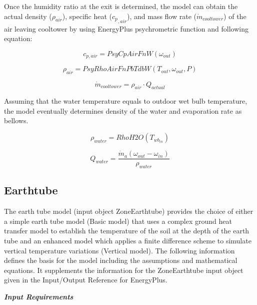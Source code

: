 Once the humidity ratio at the exit is determined, the model can obtain the actual density (\({\rho_{air}}\)), specific heat (\({c_p}_{,air}\)), and mass flow rate (\({\dot m_{cooltower}}\)) of the air leaving cooltower by using EnergyPlus psychrometric function and following equation:

\begin{equation}
{c_{p,air}} = PsyCpAirFnW({\omega_{out}})
\end{equation}

\begin{equation}
{\rho_{air}} = PsyRhoAirFnPbTdbW({T_{out}},{\omega_{out}},P)
\end{equation}

\begin{equation}
{\dot m_{cooltower}} = {\rho_{air}} \cdot {Q_{actual}}
\end{equation}

Assuming that the water temperature equals to outdoor wet bulb temperature, the model eventually determines density of the water and evaporation rate as bellows.

\begin{equation}
{\rho_{water}} = RhoH2O({T_{w{b_{in}}}})
\end{equation}

\begin{equation}
{Q_{water}} = \frac{{{{\dot m}_a}({\omega_{out}} - {\omega_{in}})}}{{{\rho_{water}}}}
\end{equation}

\subsection{Earthtube}\label{earthtube}

The earth tube model (input object ZoneEarthtube) provides the choice of either a simple earth tube model (Basic model) that uses a complex ground heat transfer model to establish the temperature of the soil at the depth of the earth tube and an enhanced model which applies a finite difference scheme to simulate vertical temperature variations (Vertical model). The following information defines the basis for the model including the assumptions and mathematical equations. It supplements the information for the ZoneEarthtube input object given in the Input/Output Reference for EnergyPlus.

\emph{\textbf{Input Requirements}}

